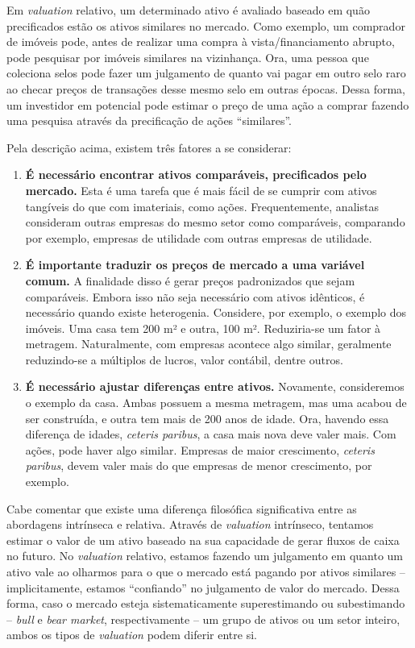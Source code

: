 \documentclass[grad,numbers]{coppe}
\providecommand{\tightlist}{%
  \setlength{\itemsep}{0pt}\setlength{\parskip}{0pt}}
\begin{document}
  Em \emph{valuation} relativo, um determinado ativo é avaliado baseado em quão precificados estão os ativos similares no mercado. Como exemplo, um comprador de imóveis pode, antes de realizar uma compra à vista/financiamento abrupto, pode pesquisar por imóveis similares na vizinhança. Ora, uma pessoa que coleciona selos pode fazer um julgamento de quanto vai pagar em outro selo raro ao checar preços de transações desse mesmo selo em outras épocas. Dessa forma, um investidor em potencial pode estimar o preço de uma ação a comprar fazendo uma pesquisa através da precificação de ações ``similares''.

  Pela descrição acima, existem três fatores a se considerar:
  \begin{enumerate}
  \def\labelenumi{\arabic{enumi}.}
  \tightlist
  \item
    \textbf{É necessário encontrar ativos comparáveis, precificados pelo mercado.} Esta é uma tarefa que é mais fácil de se cumprir com ativos tangíveis do que com imateriais, como ações. Frequentemente, analistas consideram outras empresas do mesmo setor como comparáveis, comparando por exemplo, empresas de utilidade com outras empresas de utilidade.
  \item
    \textbf{É importante traduzir os preços de mercado a uma variável comum.} A finalidade disso é gerar preços padronizados que sejam comparáveis. Embora isso não seja necessário com ativos idênticos, é necessário quando existe heterogenia. Considere, por exemplo, o exemplo dos imóveis. Uma casa tem 200 m² e outra, 100 m². Reduziria-se um fator à metragem. Naturalmente, com empresas acontece algo similar, geralmente reduzindo-se a múltiplos de lucros, valor contábil, dentre outros.
  \item
    \textbf{É necessário ajustar diferenças entre ativos.} Novamente, consideremos o exemplo da casa. Ambas possuem a mesma metragem, mas uma acabou de ser construída, e outra tem mais de 200 anos de idade. Ora, havendo essa diferença de idades, \emph{ceteris paribus}, a casa mais nova deve valer mais. Com ações, pode haver algo similar. Empresas de maior crescimento, \emph{ceteris paribus}, devem valer mais do que empresas de menor crescimento, por exemplo.
  \end{enumerate}
  Cabe comentar que existe uma diferença filosófica significativa entre as abordagens intrínseca e relativa. Através de \emph{valuation} intrínseco, tentamos estimar o valor de um ativo baseado na sua capacidade de gerar fluxos de caixa no futuro. No \emph{valuation} relativo, estamos fazendo um julgamento em quanto um ativo vale ao olharmos para o que o mercado está pagando por ativos similares -- implicitamente, estamos ``confiando'' no julgamento de valor do mercado. Dessa forma, caso o mercado esteja sistematicamente superestimando ou subestimando -- \emph{bull} e \emph{bear market}, respectivamente -- um grupo de ativos ou um setor inteiro, ambos os tipos de \emph{valuation} podem diferir entre si.
\end{document}
